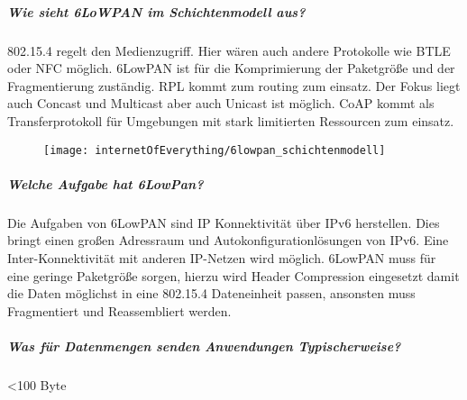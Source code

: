	\subparagraph{Wie sieht 6LoWPAN im Schichtenmodell aus?}
	802.15.4  regelt den Medienzugriff. Hier wären auch andere Protokolle wie BTLE oder NFC möglich.
	6LowPAN ist für die Komprimierung der Paketgröße und der Fragmentierung zuständig.
	RPL kommt zum routing zum einsatz. Der Fokus liegt auch Concast und Multicast aber auch Unicast ist möglich.
	CoAP kommt als Transferprotokoll für Umgebungen mit stark limitierten Ressourcen zum einsatz.
	\begin{figure}[H]
		\centering
		\texttt{[image: internetOfEverything/6lowpan\_schichtenmodell]}
		
		
	\end{figure}
	
	\subparagraph{Welche Aufgabe hat 6LowPan?}
	Die Aufgaben von 6LowPAN sind IP Konnektivität über IPv6 herstellen. Dies bringt einen großen Adressraum und Autokonfigurationlösungen von IPv6. Eine Inter-Konnektivität mit anderen IP-Netzen wird möglich.
	6LowPAN muss für eine geringe Paketgröße sorgen, hierzu wird Header Compression eingesetzt damit die Daten möglichst in eine 802.15.4 Dateneinheit passen, ansonsten muss Fragmentiert und Reassembliert werden.
	
	\subparagraph{Was für Datenmengen senden Anwendungen Typischerweise?}
	<100 Byte
	
	
	
	
	
	
	
	
	
	
			
	
	
	
	